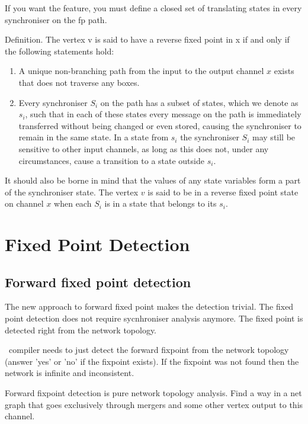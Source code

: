 If you want the feature, you must define a closed set of translating states in every synchroniser on the fp path.


Definition. The vertex v is said to have a reverse fixed point in x if and only if the following statements hold:

\begin{enumerate}
\item A unique non-branching path from the input to the output channel $x$ exists that does not traverse any boxes.

\item Every synchroniser $S_i$ on the path has a subset of states, which we denote as $s_i$, such that in each of these states every message on the path is immediately transferred without being changed or even stored, causing the synchroniser to remain in the same state. In a state from $s_i$ the synchroniser $S_i$ may still be sensitive to other input channels, as long as this does not, under any circumstances, cause a transition to a state outside $s_i$.
\end{enumerate}

It should also be borne in mind that the values of any state variables form a part of the synchroniser state.
The vertex $v$ is said to be in a reverse fixed point state on channel $x$ when each $S_i$ is in a state that belongs to its $s_i$.


    \section{Fixed Point Detection\label{fp_detect}}

    \subsection{Forward fixed point detection\label{ffp_detect}}
The new approach to forward fixed point makes the detection trivial. The fixed point detection does not require sycnhroniser analysis anymore. The fixed point is detected right from the network topology.

\ak\ compiler needs to just detect the forward fixpoint from the network topology (answer 'yes' or 'no' if the fixpoint exists). If the fixpoint was not found then the network is infinite and inconsistent.

Forward fixpoint detection is pure network topology analysis. Find a way in a net graph that goes exclusively through mergers and some other vertex output to this channel.

